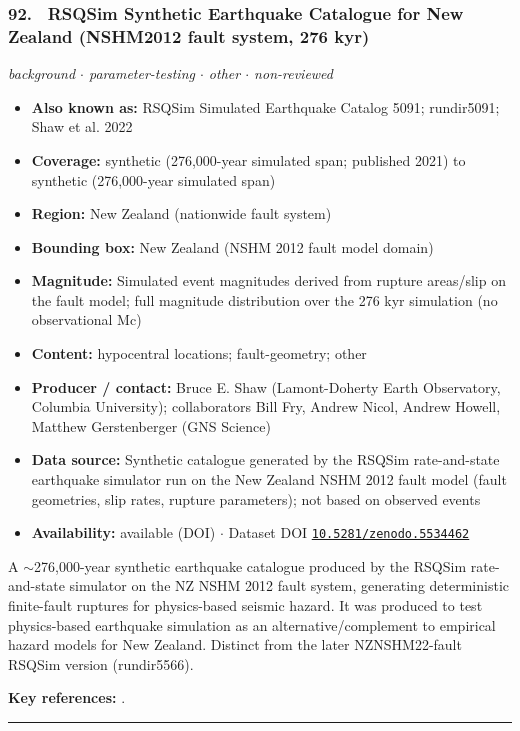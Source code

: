 \documentclass[10pt,a4paper]{article}
\newcommand{\catentryrule}{\par\vspace{3pt}\noindent\textcolor{rulegrey}{\rule{\linewidth}{0.3pt}}\par\vspace{5pt}}
\newcommand{\kv}[2]{\item \textbf{#1:} #2}
\begin{document}
\subsubsection*{\hypertarget{c:92}{92.}~ RSQSim Synthetic Earthquake Catalogue for New Zealand (NSHM2012 fault system, 276 kyr)}
{\small\itshape background $\cdot$ parameter-testing $\cdot$ other $\cdot$ non-reviewed}\par\vspace{2pt}
\begin{itemize}[leftmargin=1.3em,itemsep=0.6pt,topsep=1pt,parsep=0pt]
\kv{Also known as}{RSQSim Simulated Earthquake Catalog 5091; rundir5091; Shaw et al. 2022}
\kv{Coverage}{synthetic (276,000-year simulated span; published 2021) to synthetic (276,000-year simulated span)}
\kv{Region}{New Zealand (nationwide fault system)}
\kv{Bounding box}{New Zealand (NSHM 2012 fault model domain)}
\kv{Magnitude}{Simulated event magnitudes derived from rupture areas/slip on the fault model; full magnitude distribution over the 276 kyr simulation (no observational Mc)}
\kv{Content}{hypocentral locations; fault-geometry; other}
\kv{Producer / contact}{Bruce E. Shaw (Lamont-Doherty Earth Observatory, Columbia University); collaborators Bill Fry, Andrew Nicol, Andrew Howell, Matthew Gerstenberger (GNS Science)}
\kv{Data source}{Synthetic catalogue generated by the RSQSim rate-and-state earthquake simulator run on the New Zealand NSHM 2012 fault model (fault geometries, slip rates, rupture parameters); not based on observed events}
\kv{Availability}{available (DOI) $\cdot$ Dataset DOI \href{https://doi.org/10.5281/zenodo.5534462}{\nolinkurl{10.5281/zenodo.5534462}}}
\end{itemize}
\par\vspace{2pt}A $\sim$276,000-year synthetic earthquake catalogue produced by the RSQSim rate-and-state simulator on the NZ NSHM 2012 fault system, generating deterministic finite-fault ruptures for physics-based seismic hazard. It was produced to test physics-based earthquake simulation as an alternative/complement to empirical hazard models for New Zealand. Distinct from the later NZNSHM22-fault RSQSim version (rundir5566).
\par\vspace{2pt}\textbf{Key references:} \cite{Shaw2021,Shaw2022}.
\catentryrule
\end{document}
